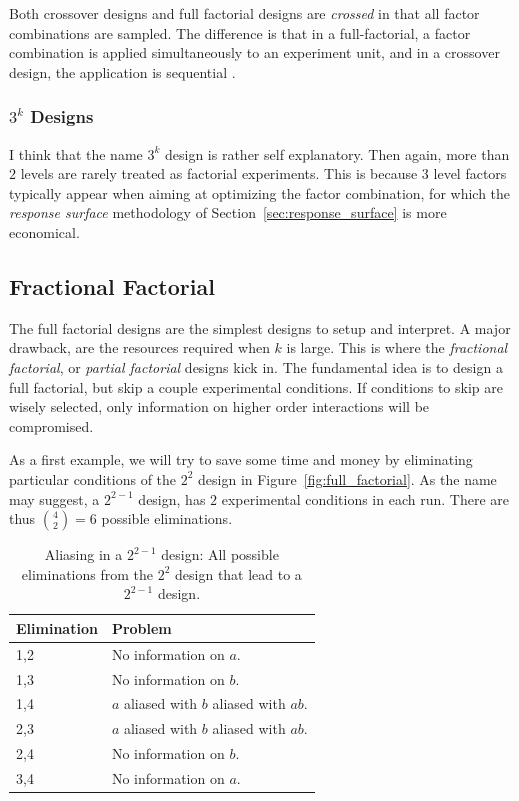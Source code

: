 \begin{remark}
Both crossover designs and full factorial designs are \emph{crossed} in that all factor combinations are sampled. 
The difference is that in a full-factorial, a factor combination is applied simultaneously to an experiment unit, and in a crossover design, the application is sequential \citep{everitt_cambridge_2010}.
\end{remark}



\subsubsection{$3^k$ Designs}
I think that the name $3^k$ design is rather self explanatory.
Then again, more than $2$ levels are rarely treated as factorial experiments. 
This is because $3$ level factors typically appear when aiming at optimizing the factor combination, for which the \emph{response surface} methodology of Section~\ref{sec:response_surface} is more economical.




\subsection{Fractional Factorial}
The full factorial designs are the simplest designs to setup and interpret. 
A major drawback, are the resources required when $k$ is large. 
This is where the \emph{fractional factorial}, or \emph{partial factorial} designs kick in.
The fundamental idea is to design a full factorial, but skip a couple experimental conditions. If conditions to skip are wisely selected, only information on higher order interactions will be compromised.


\begin{example}[From $2^2$ to $2^{(2-1)}$]
\label{eg:fractional_factorial}
As a first example, we will try to save some time and money by eliminating particular conditions of the $2^2$ design in Figure~\ref{fig:full_factorial}.
As the name may suggest, a $2^{2-1}$ design, has $2$ experimental conditions in each run. 
There are thus $\binom{4}{2}=6$ possible eliminations.
\begin{table}[ht]
\begin{tabular}{|p{2.5cm}|p{10cm}|}
\hline Elimination &  Problem \\ 
\hline
\hline 1,2 &  No information on $a$. \\ 
\hline 1,3 &  No information on $b$.\\ 
\hline 1,4 &  $a$ aliased with $b$ aliased with $ab$. \\ 
\hline 2,3 &  $a$ aliased with $b$ aliased with $ab$. \\ 
\hline 2,4 &  No information on $b$. \\ 
\hline 3,4 &  No information on $a$.\\ 
\hline 
\end{tabular} 
\label{tab:partial_factorial}
\caption{Aliasing in a $2^{2-1}$ design: All possible eliminations from the $2^2$ design that lead to a $2^{2-1}$ design.}
\end{table}
\end{example}

